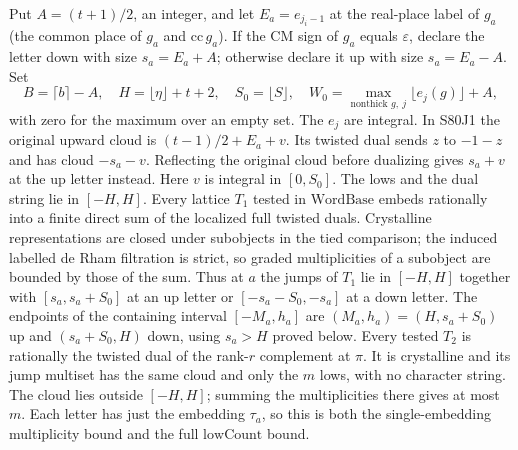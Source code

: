 Put $A=(t+1)/2$, an integer, and let $E_a=e_{j_i-1}$ at the
real-place label of $g_a$ (the common place of $g_a$ and
$\mathrm{cc}\,g_a$). If the CM sign of $g_a$ equals $\varepsilon$,
declare the letter down with size $s_a=E_a+A$; otherwise declare
it up with size $s_a=E_a-A$. Set
\[
 B=\lceil b\rceil-A,\quad
 H=\lfloor\eta\rfloor+t+2,\quad S_0=\lfloor S\rfloor,\quad
 W_0=\max_{\text{nonthick }g,\ j}\lfloor e_j(g)\rfloor+A,
\]
with zero for the maximum over an empty set. The $e_j$ are integral.
In S80J1 the original upward cloud is $(t-1)/2+E_a+v$.
Its twisted dual sends $z$ to $-1-z$ and has cloud
$-s_a-v$. Reflecting the original cloud before dualizing gives
$s_a+v$ at the up letter instead. Here $v$ is integral in $[0,S_0]$.
The lows and the dual string lie in $[-H,H]$. Every lattice
$T_1$ tested in $\mathrm{WordBase}$ embeds rationally into a
finite direct sum of the localized full twisted duals. Crystalline
representations are closed under subobjects in the tied comparison;
the induced labelled de Rham filtration is strict, so graded
multiplicities of a subobject are bounded by those of the sum.
Thus at $a$ the jumps of $T_1$ lie in $[-H,H]$ together with
$[s_a,s_a+S_0]$ at an up letter or $[-s_a-S_0,-s_a]$ at a down
letter. The endpoints of the containing interval $[-M_a,h_a]$
are $(M_a,h_a)=(H,s_a+S_0)$ up and $(s_a+S_0,H)$ down,
using $s_a>H$ proved below. Every tested $T_2$ is rationally
the twisted dual of the rank-$r$ complement at $\pi$.
It is crystalline and its jump multiset has the same cloud and
only the $m$ lows, with no character string. The cloud lies
outside $[-H,H]$; summing the multiplicities there gives at most
$m$. Each letter has just the embedding $\tau_a$, so this is both
the single-embedding multiplicity bound and the full
$\mathrm{lowCount}$ bound.


